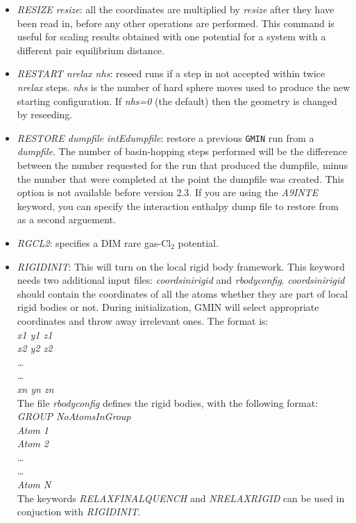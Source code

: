 \documentclass[12pt,a4paper,dvips]{article}
\begin{document}
\begin{itemize}
\item {\it RESIZE resize\/}: all the coordinates are multiplied by {\it resize\/} after
they have been read in, before any other operations are performed. This command is useful
for scaling results obtained with one potential for a system with a different pair
equilibrium distance.

\item {\it RESTART\/ nrelax nhs\/}: reseed runs if a step in not accepted
within twice {\it nrelax} steps.
{\it nhs} is the number of hard sphere moves used to produce the new starting configuration.
If {\it nhs=0} (the default) then the geometry is changed by reseeding.

\item {\it RESTORE\/ dumpfile intEdumpfile\/}: restore a previous {\tt GMIN} run from a {\it dumpfile}.
The number of basin-hopping steps performed will be the difference between the number
requested for the run that produced the dumpfile, minus the number that were completed
at the point the dumpfile was created. This option is not available before version 2.3.
If you are using the {\it A9INTE\/} keyword, you can specify the interaction enthalpy
dump file to restore from as a second arguement.

\item {\it RGCL2\/}: specifies a DIM rare gas-Cl$_2$ potential.

\item {\it RIGIDINIT\/}: This will turn on the local rigid body framework. This keyword needs two additional input files: {\it coordsinirigid\/} and {\it rbodyconfig\/}. {\it coordsinirigid\/} should contain the coordinates of all the atoms whether they are part of local rigid bodies or not. During initialization, GMIN will select appropriate coordinates and throw away irrelevant ones. The format is: \\
{\it x1 y1 z1} \\
{\it x2 y2 z2} \\
{\it \ldots} \\
{\it \ldots} \\
{\it xn yn zn} \\

The file {\it rbodyconfig\/} defines the rigid bodies, with the following format: \\
{\it GROUP NoAtomsInGroup} \\
{\it Atom 1} \\
{\it Atom 2} \\
{\it \ldots} \\
{\it \ldots} \\
{\it Atom N} \\
The keywords {\it RELAXFINALQUENCH\/} and {\it NRELAXRIGID\/} can be used in conjuction with {\it RIGIDINIT\/}.


\end{itemize}
\end{document}
